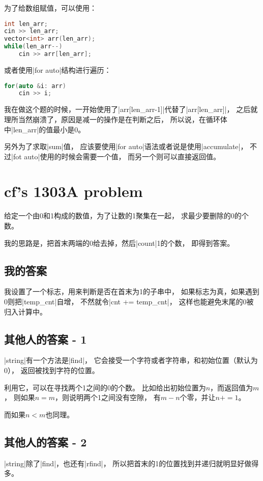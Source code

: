 为了给数组赋值，可以使用：
\begin{lstlisting}[language=C++]
int len_arr;
cin >> len_arr;
vector<int> arr(len_arr);
while(len_arr--)
    cin >> arr[len_arr];
\end{lstlisting}
或者使用\vb|for auto|结构进行遍历：
\begin{lstlisting}[language=C++]
for(auto &i: arr)
    cin >> i;
\end{lstlisting}

我在做这个题的时候，一开始使用了\vb|arr[len_arr-1]|代替了\vb|arr[len_arr]|，
之后就理所当然崩溃了，原因是减一的操作是在判断之后，
所以说，在循环体中\vb|len_arr|的值最小是0。

另外为了求取\vb|sum|值，
应该要使用\vb|for auto|语法或者说是使用\vb|accumulate|，
不过\vb|fot auto|使用的时候会需要一个值，
而另一个则可以直接返回值。


\section{cf's 1303A problem}

给定一个由0和1构成的数值，为了让数的1聚集在一起，
求最少要删除的0的个数。

我的思路是，把首末两端的0给去掉，然后\vb|count|1的个数，
即得到答案。

\subsection{我的答案}
我设置了一个标志，用来判断是否在首末为1的子串中，
如果标志为真，如果遇到0则把\vb|temp_cnt|自增，
不然就令\vb|cnt += temp_cnt|，
这样也能避免末尾的0被归入计算中。

\subsection{其他人的答案 - 1}
\vb|string|有一个方法是\vb|find|，
它会接受一个字符或者字符串，和初始位置（默认为0），
返回被找到字符的位置。

利用它，可以在寻找两个1之间的0的个数。
比如给出初始位置为$n$，而返回值为$m$，
则如果$n = m$，则说明两个1之间没有空隙，
有$m - n$个零，并让$n += 1$。

而如果$n < m$也同理。

\subsection{其他人的答案 - 2}
\vb|string|除了\vb|find|，也还有\vb|rfind|，
所以把首末的1的位置找到并递归就明显好做得多。


